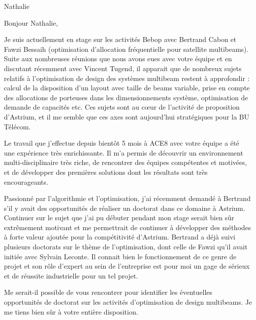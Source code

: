 \documentclass[12pt]{lettre}
\begin{document}
\begin{letter}{Nathalie}
\address{Victor Cameo Ponz\\47 rue Guynemer\\31200 Toulouse}
\nofax

\conc{}
\opening{Bonjour Nathalie,}
Je suis actuellement en stage sur les activités Bebop avec Bertrand Cabon et Fawzi Bessaih
(optimisation d'allocation fréquentielle pour satellite multibeams).
Suite aux nombreuses réunions que nous avons eues avec votre équipe et en
discutant récemment avec Vincent Tugend,
il apparait que de nombreux sujets relatifs à l'optimisation de design des systèmes
multibeam restent à approfondir : calcul de la disposition d'un layout avec taille de beams variable,
prise en compte des allocations de porteuses dans les dimensionnements système,
optimisation de demande de capacités etc.
Ces sujets sont au cœur de l'activité de proposition d'Astrium,
et il me semble que ces axes sont aujourd'hui stratégiques pour la BU Télécom.

Le travail que j'effectue depuis bientôt 5 mois à ACE8 avec votre équipe a été une expérience très enrichissante. Il m'a permis de découvrir un environnement multi-disciplinaire très riche, de rencontrer des équipes compétentes et motivées, et de développer des premières solutions dont les résultats sont très encourageants.

Passionné par l'algorithmie et l'optimisation, j'ai récemment demandé à Bertrand s'il y avait des opportunités de réaliser un doctorat dans ce domaine à Astrium. Continuer sur le sujet que j'ai pu débuter pendant mon stage serait bien sûr extrêmement motivant et me permettrait de continuer à développer des méthodes à forte valeur ajoutée pour la compétitivité d'Astrium. Bertrand a déjà suivi plusieurs doctorats sur le thème de l'optimisation, dont celle de Fawzi qu'il avait initiée avec Sylvain Leconte. Il connait bien le fonctionnement de ce genre de projet et son rôle d'expert au sein de l'entreprise est pour moi un gage de sérieux et de réussite industrielle pour un tel projet.

Me serait-il possible de vous rencontrer pour identifier les éventuelles opportunités de doctorat sur les activités d'optimisation de design multibeams. Je me tiens bien sûr à votre entière disposition.

\closing{}
\end{letter}
\end{document}
